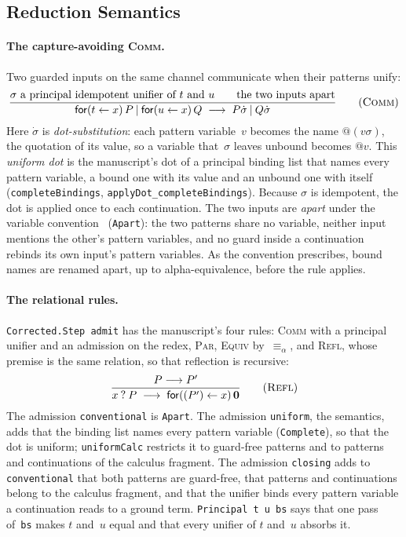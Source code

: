 \documentclass[11pt]{article}
\theoremstyle{definition}
\theoremstyle{remark}
\begin{document}
\subsection{Reduction Semantics}
\label{sec:metta-reduction}

\paragraph{The capture-avoiding \textsc{Comm}.}
Two guarded inputs on the same channel communicate when their patterns
unify:
\begin{equation}
  \frac{\sigma \text{ a principal idempotent unifier of } t \text{ and } u
        \qquad \text{the two inputs apart}}
       {\mathsf{for}(t \leftarrow x)\, P \mathbin{|}
        \mathsf{for}(u \leftarrow x)\, Q
        \;\longrightarrow\;
        P\dot\sigma \mathbin{|} Q\dot\sigma}
  \tag{\textsc{Comm}}
\end{equation}
Here $\dot\sigma$ is \emph{dot-substitution}: each pattern variable~$v$
becomes the name $@(v\sigma)$, the quotation of its value, so a variable
that~$\sigma$ leaves unbound becomes $@v$.  This \emph{uniform dot} is the
manuscript's dot of a principal binding list that names every pattern
variable, a bound one with its value and an unbound one with itself
(\texttt{completeBindings}, \texttt{applyDot\_completeBindings}).  Because
$\sigma$ is idempotent, the dot is applied once to each continuation.  The
two inputs are \emph{apart} under the variable
convention~\cite{Barendregt1984,UrbanBerghoferNorrish2007}
(\texttt{Apart}): the two patterns share no variable, neither input
mentions the other's pattern variables, and no guard inside a
continuation rebinds its own input's pattern variables.  As the convention
prescribes, bound names are renamed apart, up to alpha-equivalence, before
the rule applies.

\paragraph{The relational rules.}
\texttt{Corrected.Step admit} has the manuscript's four rules:
\textsc{Comm} with a principal unifier and an admission on the redex,
\textsc{Par}, \textsc{Equiv} by~$\equiv_\alpha$, and \textsc{Refl}, whose
premise is the same relation, so that reflection is recursive:
\begin{equation}
  \frac{P \longrightarrow P'}
       {x\mathbin{?}P \;\longrightarrow\;
        \mathsf{for}((P') \leftarrow x)\, \mathbf{0}}
  \tag{\textsc{Refl}}
\end{equation}
The admission \texttt{conventional} is \texttt{Apart}.  The admission
\texttt{uniform}, the semantics, adds that the binding list names every
pattern variable (\texttt{Complete}), so that the dot is uniform;
\texttt{uniformCalc} restricts it to guard-free patterns and to patterns and
continuations of the calculus fragment.  The admission \texttt{closing} adds
to \texttt{conventional} that both patterns are guard-free, that patterns and
continuations belong to the calculus fragment, and that the unifier binds
every pattern variable a continuation reads to a ground term.
\texttt{Principal t u bs} says that one pass of~\texttt{bs} makes $t$
and~$u$ equal and that every unifier of $t$ and~$u$ absorbs it.
\end{document}
